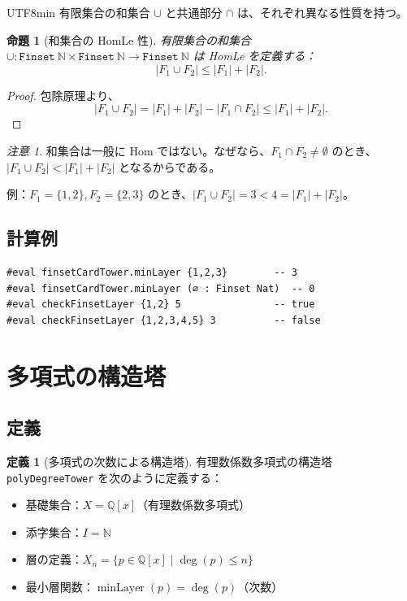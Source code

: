\documentclass[12pt,a4paper]{article}
\newtheorem{proposition}[theorem]{命題}
\theoremstyle{definition}
\newtheorem{definition}[theorem]{定義}
\theoremstyle{remark}
\newtheorem{remark}[theorem]{注意}
\newcommand{\N}{\mathbb{N}}
\newcommand{\Q}{\mathbb{Q}}
\DeclareMathOperator{\minLayer}{minLayer}
\begin{document}
\begin{CJK}{UTF8}{min}
有限集合の和集合 $\cup$ と共通部分 $\cap$ は、それぞれ異なる性質を持つ。

\begin{proposition}[和集合の HomLe 性]
有限集合の和集合 $\cup: \texttt{Finset}\ \N \times \texttt{Finset}\ \N \to \texttt{Finset}\ \N$ は HomLe を定義する：
$$|F_1 \cup F_2| \leq |F_1| + |F_2|.$$
\end{proposition}

\begin{proof}
包除原理より、
$$|F_1 \cup F_2| = |F_1| + |F_2| - |F_1 \cap F_2| \leq |F_1| + |F_2|.$$
\end{proof}

\begin{remark}
和集合は一般に Hom ではない。なぜなら、$F_1 \cap F_2 \neq \emptyset$ のとき、$|F_1 \cup F_2| < |F_1| + |F_2|$ となるからである。

例：$F_1 = \{1, 2\}, F_2 = \{2, 3\}$ のとき、$|F_1 \cup F_2| = 3 < 4 = |F_1| + |F_2|$。
\end{remark}

\subsection{計算例}

\begin{tcolorbox}[title=Lean での実装例]
\begin{verbatim}
#eval finsetCardTower.minLayer {1,2,3}        -- 3
#eval finsetCardTower.minLayer (∅ : Finset Nat)  -- 0
#eval checkFinsetLayer {1,2} 5                -- true
#eval checkFinsetLayer {1,2,3,4,5} 3          -- false
\end{verbatim}
\end{tcolorbox}

\section{多項式の構造塔}

\subsection{定義}

\begin{definition}[多項式の次数による構造塔]
有理数係数多項式の構造塔 \texttt{polyDegreeTower} を次のように定義する：
\begin{itemize}
\item 基礎集合：$X = \Q[x]$（有理数係数多項式）
\item 添字集合：$I = \N$
\item 層の定義：$X_n = \{p \in \Q[x] \mid \deg(p) \leq n\}$
\item 最小層関数：$\minLayer(p) = \deg(p)$（次数）
\end{itemize}
\end{definition}


\end{CJK}
\end{document}
